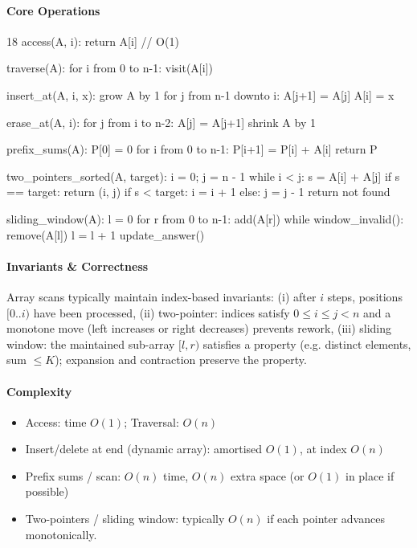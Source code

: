 \paragraph{Core Operations}
\begin{CodeBlock}[style=pseudo,caption={Arrays: Core Operations (pseudocode)}]{18}
access(A, i):
    return A[i] // O(1)

traverse(A):
  for i from 0 to n-1:
    visit(A[i])

insert_at(A, i, x):
  grow A by 1
  for j from n-1 downto i:
    A[j+1] = A[j]
  A[i] = x

erase_at(A, i):
  for j from i to n-2:
    A[j] = A[j+1]
  shrink A by 1

prefix_sums(A):
  P[0] = 0
  for i from 0 to n-1:
    P[i+1] = P[i] + A[i]
  return P

two_pointers_sorted(A, target): 
  i = 0; j = n - 1
  while i < j:
    s = A[i] + A[j]
    if s == target: return (i, j)
    if s < target: i = i + 1 else: j = j - 1
  return not found

sliding_window(A):             
  l = 0
  for r from 0 to n-1:
    add(A[r])         
    while window_invalid():
      remove(A[l])
      l = l + 1
    update_answer()
\end{CodeBlock}

\paragraph{Invariants \& Correctness}
Array scans typically maintain index-based invariants:
(i) after $i$ steps, positions $[0..i)$ have been processed,
(ii) two-pointer: indices satisfy $0 \le i \le j < n$ and a monotone move (left increases or right decreases) prevents rework,
(iii) sliding window: the maintained sub-array $[l,r)$ satisfies a property (e.g. distinct elements, sum $\le K$); expansion and contraction preserve the property.

\paragraph{Complexity}
\begin{itemize}[nosep]
  \item Access: time $O(1)$; Traversal: $O(n)$
  \item Insert/delete at end (dynamic array): amortised $O(1)$, at index $O(n)$
  \item Prefix sums / scan: $O(n)$ time, $O(n)$ extra space (or $O(1)$ in place if possible)
  \item Two-pointers / sliding window: typically $O(n)$ if each pointer advances monotonically.
\end{itemize}

